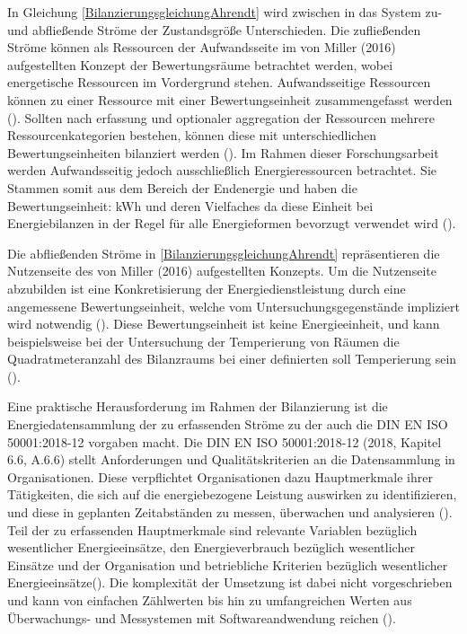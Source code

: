 In Gleichung \eqref{BilanzierungsgleichungAhrendt} wird zwischen in das System zu- und abfließende Ströme der Zustandsgröße Unterschieden.
Die zufließenden Ströme können als Ressourcen der Aufwandsseite im von Miller (2016) aufgestellten Konzept der Bewertungsräume betrachtet werden, 
wobei energetische Ressourcen im Vordergrund stehen. Aufwandsseitige Ressourcen können zu einer Ressource mit einer Bewertungseinheit 
zusammengefasst werden (\cite[S. 112]{Miller.2016}). Sollten nach erfassung und optionaler aggregation der Ressourcen mehrere Ressourcenkategorien bestehen, 
können diese mit unterschiedlichen Bewertungseinheiten bilanziert werden (\cite[S. 112]{Miller.2016}). Im Rahmen dieser Forschungsarbeit werden 
Aufwandsseitig jedoch ausschließlich Energieressourcen betrachtet.
Sie Stammen somit aus dem Bereich der Endenergie und haben die Bewertungseinheit: kWh und deren Vielfaches da diese Einheit bei Energiebilanzen in der Regel für alle 
Energieformen bevorzugt verwendet wird (\cite[S. 65]{Konstantin.2023}).

Die abfließenden Ströme in \eqref{BilanzierungsgleichungAhrendt} repräsentieren die Nutzenseite des von Miller (2016) aufgestellten Konzepts.
Um die Nutzenseite abzubilden ist eine Konkretisierung der Energiedienstleistung durch eine angemessene Bewertungseinheit, 
welche vom Untersuchungsgegenstände impliziert wird notwendig (\cite{Miller.2016}). Diese Bewertungseinheit ist keine Energieeinheit, und 
kann beispielsweise bei der Untersuchung der Temperierung von Räumen die Quadratmeteranzahl des Bilanzraums bei einer definierten 
soll Temperierung sein (\cite{Miller.2016}). 

Eine praktische Herausforderung im Rahmen der Bilanzierung ist die Energiedatensammlung der zu erfassenden Ströme zu der auch die DIN EN ISO 50001:2018-12 vorgaben macht. 
Die DIN EN ISO 50001:2018-12 (2018, Kapitel 6.6, A.6.6) stellt Anforderungen und Qualitätskriterien an die Datensammlung in Organisationen.
Diese verpflichtet Organisationen dazu Hauptmerkmale ihrer Tätigkeiten, die sich auf die energiebezogene Leistung auswirken zu identifizieren, und diese in geplanten 
Zeitabständen zu messen, überwachen und analysieren (\cite[S. 23]{DIN50001.2018}).
Teil der zu erfassenden Hauptmerkmale sind relevante Variablen bezüglich wesentlicher Energieeinsätze, den Energieverbrauch bezüglich wesentlicher Einsätze 
und der Organisation und betriebliche Kriterien bezüglich wesentlicher Energieeinsätze(\cite[S. 23]{DIN50001.2018}).
Die komplexität der Umsetzung ist dabei nicht vorgeschrieben und kann von einfachen Zählwerten bis hin zu umfangreichen Werten aus Überwachungs- und Messystemen mit 
Softwareandwendung reichen (\cite[S. 36]{DIN50001.2018}).

